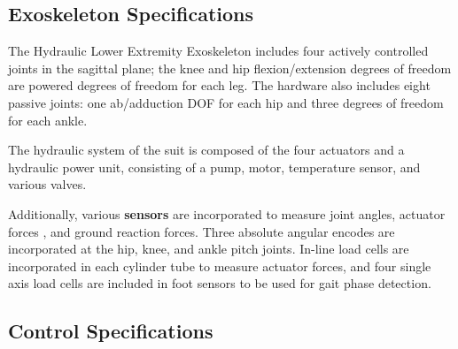  

 
 \subsection{Exoskeleton Specifications}
 
 The Hydraulic Lower Extremity Exoskeleton includes four actively controlled joints in the sagittal plane; the knee and hip flexion/extension degrees of freedom are powered degrees of freedom for each leg.  The hardware also includes eight passive joints: one ab/adduction DOF for each hip and three degrees of freedom for each ankle.
 
 The hydraulic system of the suit is composed of the four actuators and a hydraulic power unit, consisting of a pump, motor, temperature sensor, and various valves.
 
 Additionally, various {\bf sensors} are incorporated to measure joint angles, actuator forces , and ground reaction forces.  Three absolute angular encodes are incorporated at the hip, knee, and ankle pitch joints.  In-line load cells are incorporated in each cylinder tube to measure actuator forces, and four single axis load cells are included in foot sensors to be used for gait phase detection.
 
 \subsection{Control Specifications}
 
